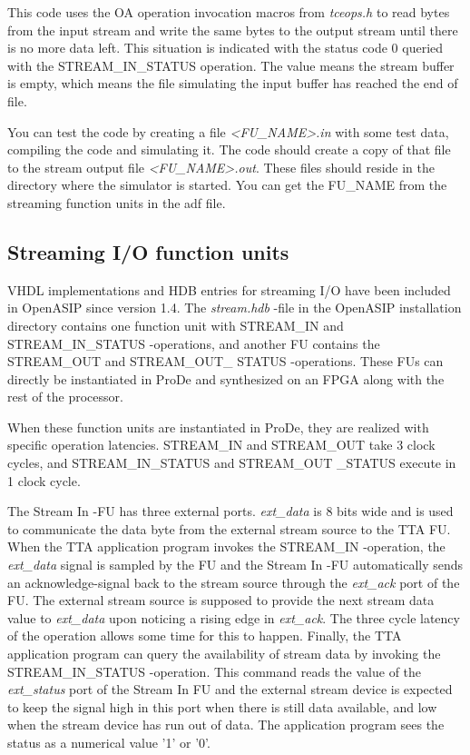 \documentclass[a4paper,twoside]{tceusermanual}
\begin{document}
This code uses the OA operation invocation macros from \textit{tceops.h}
to read bytes from the input stream and write the same bytes to the
output stream until there is no more data left. This situation is indicated
with the status code 0 queried with the STREAM\_IN\_STATUS operation. The
value means the stream buffer is empty, which means the file simulating the
input buffer has reached the end of file.

You can test the code by creating a file \textit{<FU\_NAME>.in} with some test
data, compiling the code and simulating it. The code should create a copy of
that file to the stream output file \textit{<FU\_NAME>.out}. These files
should reside in the directory where the simulator is started. You can get
the FU\_NAME from the streaming function units in the adf file.

\subsection{Streaming I/O function units}
VHDL implementations and HDB entries for streaming I/O have been included 
in OpenASIP since version 1.4. The \textit{stream.hdb} -file in the OpenASIP installation
directory contains one function unit with STREAM\_IN and
STREAM\_IN\_STATUS -operations, and another FU contains the STREAM\_OUT and STREAM\_OUT\_
STATUS
-operations. These FUs can directly be instantiated in ProDe and synthesized
on an FPGA along with the rest of the processor.

When these function units are instantiated in ProDe, they are realized with
specific operation latencies. STREAM\_IN and STREAM\_OUT
take 3 clock cycles, and STREAM\_IN\_STATUS and STREAM\_OUT
\_STATUS execute in 1 clock cycle.

The Stream In -FU has three external ports. \textit{ext\_data} is 8 bits wide
and is used to communicate the data byte from the external stream source to the 
TTA FU. When the TTA application program invokes the STREAM\_IN -operation, the
\textit{ext\_data} signal is sampled by the FU and the Stream In -FU automatically sends
an acknowledge-signal back to the stream source through the \textit{ext\_ack}
port of the FU. The external stream source is supposed to provide the next stream
data value to \textit{ext\_data} upon noticing a rising edge in \textit{ext\_ack}.
The three cycle latency of the operation allows some time for this to happen. Finally,
the TTA application program can query the availability of stream data by invoking
the STREAM\_IN\_STATUS -operation. This command reads the value of the \textit{ext\_status}
port of the Stream In FU and the external stream device is expected to keep the signal
high in this port when there is still data available, and low when the stream 
device has run out of data. The application program sees the status as a numerical 
value '1' or '0'.
\end{document}
